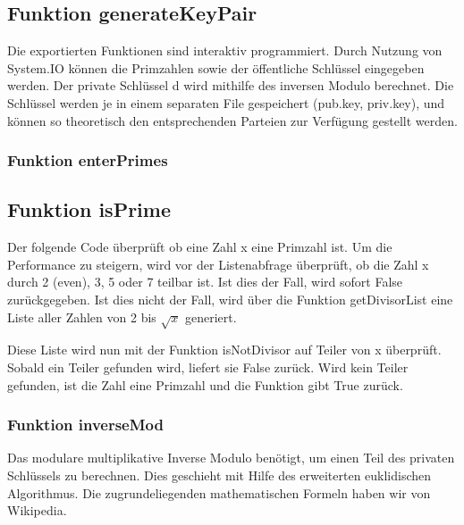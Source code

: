 \documentclass[a4paper, 11pt]{article} %
\begin{document}
\subsection{Funktion generateKeyPair}
Die exportierten Funktionen sind interaktiv programmiert. Durch Nutzung von System.IO können die Primzahlen sowie der öffentliche Schlüssel eingegeben werden. Der private Schlüssel d wird mithilfe des inversen Modulo berechnet.
Die Schlüssel werden je in einem separaten File gespeichert (pub.key, priv.key), und können so theoretisch den entsprechenden Parteien zur Verfügung gestellt werden.


\subsubsection{Funktion enterPrimes}


\subsection{Funktion isPrime}
Der folgende Code überprüft ob eine Zahl x eine Primzahl ist. Um die Performance zu steigern, wird vor der Listenabfrage überprüft, ob die Zahl x durch 2 (even), 3, 5 oder 7 teilbar ist. Ist dies der Fall, wird sofort False zurückgegeben.
Ist dies nicht der Fall, wird über die Funktion getDivisorList eine Liste aller Zahlen von 2 bis $\sqrt{x}$ generiert.

Diese Liste wird nun mit der Funktion isNotDivisor auf Teiler von x überprüft. Sobald ein Teiler gefunden wird, liefert sie False zurück. Wird kein Teiler gefunden, ist die Zahl eine Primzahl und die Funktion gibt True zurück.


\subsubsection{Funktion inverseMod}
Das modulare multiplikative Inverse Modulo benötigt, um einen Teil des privaten Schlüssels zu berechnen. Dies geschieht mit Hilfe des erweiterten euklidischen Algorithmus. Die zugrundeliegenden mathematischen Formeln haben wir von Wikipedia.

\end{document}
